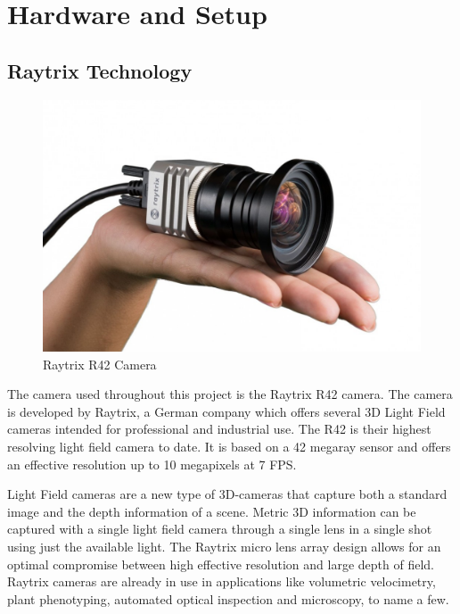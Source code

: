 \section{Hardware and Setup} \label{hardware}

\subsection{Raytrix Technology}\label{the_raytrix_camera}

\begin{figure}[ht]
    \centering
    \includegraphics[width=.9\linewidth]{images/hardware/raytrix_camera}
    \caption{Raytrix R42 Camera\cite{website:raytrix_r42}}
    \label{fig:raytrix_camera}
\end{figure}

The camera used throughout this project is the Raytrix R42 camera. The camera is developed by Raytrix, a German company which offers several 3D Light Field cameras intended for professional and industrial use. The R42 is their highest resolving light field camera to date. It is based on a 42 megaray sensor and offers an effective resolution up to 10 megapixels at 7 FPS.\cite{website:raytrix_r42}

Light Field cameras are a new type of 3D-cameras that capture both a standard image and the depth information of a scene. Metric 3D information can be captured with a single light field camera through a single lens in a single shot using just the available light. The Raytrix micro lens array design allows for an optimal compromise between high effective resolution and large depth of field. Raytrix cameras are already in use in applications like volumetric velocimetry, plant phenotyping, automated optical inspection and microscopy, to name a few.\cite{website:raytrix_main}

